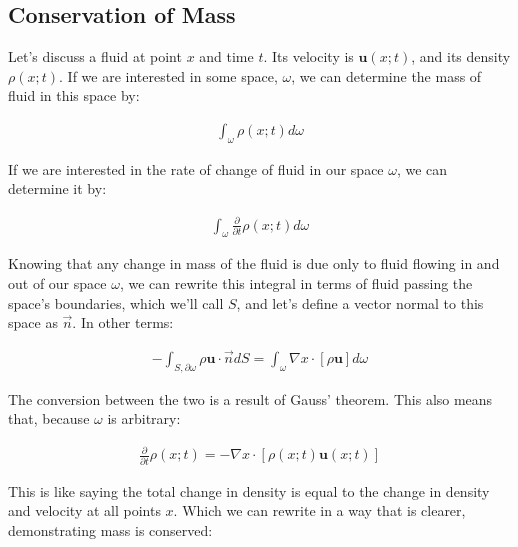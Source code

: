 \subsection{Conservation of Mass}

Let's discuss a fluid at point $x$ and time $t$. Its velocity is $\mathbf{u}(x;t)$, and its density $\rho(x;t)$. If we are interested in some space, $\omega$, we can determine the mass of fluid in this space by: 

\begin{equation} \label{phenom1}
\begin{split}
\int_\omega \rho(x;t)d\omega
\end{split}
\end{equation}

If we are interested in the rate of change of fluid in our space $\omega$, we can determine it by:

\begin{equation} \label{phenom1}
\begin{split}
\int_\omega
\frac{\partial}{\partial t}\rho(x;t)d\omega
\end{split}
\end{equation}

Knowing that any change in mass of the fluid is due only to fluid flowing in and out of our space $\omega$, we can rewrite this integral in terms of fluid passing the space's boundaries, which we'll call $S$, and let's define a vector normal to this space as $\Vec{n}$. In other terms: 

\begin{equation} \label{phenom1}
\begin{split}
-\int_{S,\partial\omega}
\rho \mathbf{u} \cdot \Vec{n}dS = \int_\omega \nabla x \cdot [\rho \mathbf{u}]d\omega
\end{split}
\end{equation}


The conversion between the two is a result of Gauss' theorem. This also means that, because $\omega$ is arbitrary: 

\begin{equation} \label{phenom1}
\begin{split}
\frac{\partial}{\partial t}\rho(x;t) = -\nabla x\cdot [\rho(x;t)\mathbf{u}(x;t)]
\end{split}
\end{equation}

This is like saying the total change in density is equal to the change in density and velocity at all points $x$. Which we can rewrite in a way that is clearer, demonstrating mass is conserved: 


